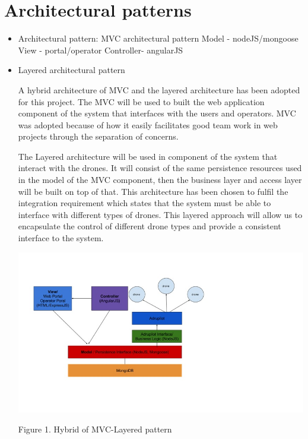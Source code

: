 \documentclass{article}
\begin{document}
	\section{Architectural patterns}%
	
	\begin{itemize}
	
	\item Architectural pattern:
	MVC architectural pattern
	Model - nodeJS/mongoose
	View - portal/operator
	Controller- angularJS
	
	\item Layered architectural pattern
	
	
	 A hybrid architecture of MVC and the layered architecture has been adopted for this project. The MVC will be used to built the web application component of the system that interfaces with the users and operators. MVC was adopted because of how it easily facilitates good team work in web projects through the separation of concerns. 
	 
	 The Layered architecture will be used in component of the system that interact with the drones. It will consist of the same persistence resources used in the model of the MVC component, then the business layer and access layer will be built on top of that. This architecture has been chosen to fulfil the integration requirement which states that the system must be able to interface with different types of drones. This layered approach will allow us to encapsulate the control of different drone types and provide a consistent interface to the system.
	
	\includegraphics{images/MVCLayered}
	
	Figure 1. Hybrid of MVC-Layered pattern
	
	\end{itemize}
	
\end{document}

